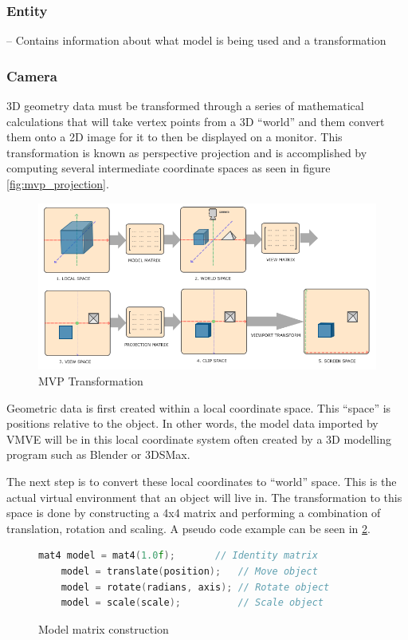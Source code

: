 \documentclass[11pt]{article}
\begin{document}
\subsubsection{Entity}
-- Contains information about what model is being used and a transformation


\subsubsection{Camera}
3D geometry data must be transformed through a series of mathematical
calculations that will take vertex points from a 3D ``world'' and them convert
them onto a 2D image for it to then be displayed on a monitor. This
transformation is known as perspective projection \cite{3d_projection} and is
accomplished by computing several intermediate coordinate spaces as seen in
figure \ref{fig:mvp_projection}.

\begin{figure}[h!]
  \centering
  \includegraphics[width=\textwidth]{images/mvp.png}
  \caption{MVP Transformation \cite{coordinate_systems}}
  \label{fig:mvp_transformation} 
\end{figure}

Geometric data is first created within a local coordinate space. This ``space''
is positions relative to the object. In other words, the model data imported by
VMVE will be in this local coordinate system often created by a 3D modelling
program such as Blender or 3DSMax.

The next step is to convert these local coordinates to ``world'' space. This is
the actual virtual environment that an object will live in. The transformation
to this space is done by constructing a 4x4 matrix and performing a combination
of translation, rotation and scaling. A pseudo code example can be seen in
\ref{fig:local_to_world}.

\begin{figure}[ht]
  \centering
  \begin{lstlisting}[language=C++]
    mat4 model = mat4(1.0f);       // Identity matrix
    model = translate(position);   // Move object
    model = rotate(radians, axis); // Rotate object
    model = scale(scale);          // Scale object
  \end{lstlisting}
  \caption{Model matrix construction}
  \label{fig:local_to_world}
\end{figure}
  
\end{document}

